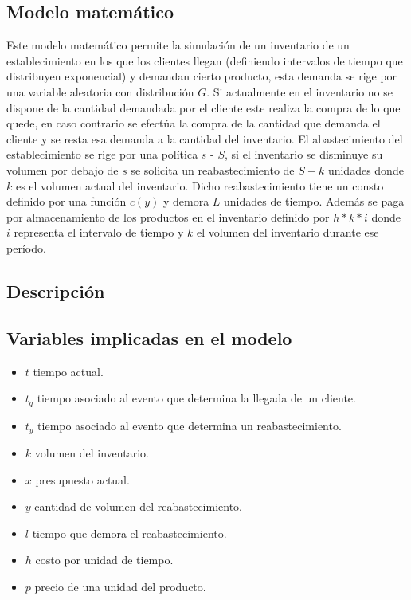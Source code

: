 \documentclass{article}
\begin{document}
\begin{itemize}
\section*{Modelo matemático}
Este modelo matemático permite la simulación de un inventario de un establecimiento en los que los clientes llegan (definiendo intervalos de tiempo que distribuyen exponencial) y demandan cierto producto, esta demanda se rige por una variable aleatoria con distribución $G$. Si actualmente en el inventario no se dispone de la cantidad demandada por el cliente este realiza la compra de lo que quede, en caso contrario se efectúa la compra de la cantidad que demanda el cliente y se resta esa demanda a la cantidad del inventario. El abastecimiento del establecimiento se rige por una política $s$ - $S$, si el inventario se disminuye su volumen por debajo de $s$ se solicita un reabastecimiento de $S-k$ unidades donde $k$ es el volumen actual del inventario. Dicho reabastecimiento tiene un consto definido por una función $c(y)$ y demora $L$ unidades de tiempo. Además se paga por almacenamiento de los productos en el inventario definido por $h*k*i$ donde $i$ representa el intervalo de tiempo y $k$ el volumen del inventario durante ese período.

\subsection*{Descripción}

\subsection*{Variables implicadas en el modelo}

\begin{itemize}
    \item $t$ tiempo actual.
    \item $t_q$ tiempo asociado al evento que determina la llegada de un cliente.
    \item $t_y$ tiempo asociado al evento que determina un reabastecimiento.
    \item $k$ volumen del inventario.
    \item $x$ presupuesto actual.
    \item $y$ cantidad de volumen del reabastecimiento.
    \item $l$ tiempo que demora el reabastecimiento.
    \item $h$ costo por unidad de tiempo.
    \item $p$ precio de una unidad del producto.
\end{itemize}


\end{itemize}
\end{document}
